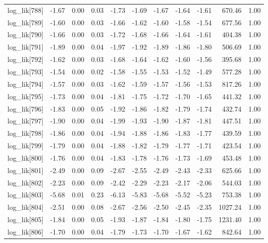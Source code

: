 \begin{table}[ht]
\begin{tabular}{rrrrrrrrrrr}
  log\_lik[788] & -1.67 & 0.00 & 0.03 & -1.73 & -1.69 & -1.67 & -1.64 & -1.61 & 670.46 & 1.00 \\ 
  log\_lik[789] & -1.60 & 0.00 & 0.03 & -1.66 & -1.62 & -1.60 & -1.58 & -1.54 & 677.56 & 1.00 \\ 
  log\_lik[790] & -1.66 & 0.00 & 0.03 & -1.72 & -1.68 & -1.66 & -1.64 & -1.61 & 404.38 & 1.00 \\ 
  log\_lik[791] & -1.89 & 0.00 & 0.04 & -1.97 & -1.92 & -1.89 & -1.86 & -1.80 & 506.69 & 1.00 \\ 
  log\_lik[792] & -1.62 & 0.00 & 0.03 & -1.68 & -1.64 & -1.62 & -1.60 & -1.56 & 395.68 & 1.00 \\ 
  log\_lik[793] & -1.54 & 0.00 & 0.02 & -1.58 & -1.55 & -1.53 & -1.52 & -1.49 & 577.28 & 1.00 \\ 
  log\_lik[794] & -1.57 & 0.00 & 0.03 & -1.62 & -1.59 & -1.57 & -1.56 & -1.53 & 817.26 & 1.00 \\ 
  log\_lik[795] & -1.73 & 0.00 & 0.04 & -1.81 & -1.75 & -1.72 & -1.70 & -1.65 & 441.32 & 1.00 \\ 
  log\_lik[796] & -1.83 & 0.00 & 0.05 & -1.92 & -1.86 & -1.82 & -1.79 & -1.74 & 432.74 & 1.00 \\ 
  log\_lik[797] & -1.90 & 0.00 & 0.04 & -1.99 & -1.93 & -1.90 & -1.87 & -1.81 & 447.51 & 1.00 \\ 
  log\_lik[798] & -1.86 & 0.00 & 0.04 & -1.94 & -1.88 & -1.86 & -1.83 & -1.77 & 439.59 & 1.00 \\ 
  log\_lik[799] & -1.79 & 0.00 & 0.04 & -1.88 & -1.82 & -1.79 & -1.77 & -1.71 & 423.54 & 1.00 \\ 
  log\_lik[800] & -1.76 & 0.00 & 0.04 & -1.83 & -1.78 & -1.76 & -1.73 & -1.69 & 453.48 & 1.00 \\ 
  log\_lik[801] & -2.49 & 0.00 & 0.09 & -2.67 & -2.55 & -2.49 & -2.43 & -2.33 & 625.66 & 1.00 \\ 
  log\_lik[802] & -2.23 & 0.00 & 0.09 & -2.42 & -2.29 & -2.23 & -2.17 & -2.06 & 544.03 & 1.00 \\ 
  log\_lik[803] & -5.68 & 0.01 & 0.23 & -6.13 & -5.83 & -5.68 & -5.52 & -5.23 & 753.38 & 1.00 \\ 
  log\_lik[804] & -2.51 & 0.00 & 0.08 & -2.67 & -2.56 & -2.50 & -2.45 & -2.35 & 1027.24 & 1.00 \\ 
  log\_lik[805] & -1.84 & 0.00 & 0.05 & -1.93 & -1.87 & -1.84 & -1.80 & -1.75 & 1231.40 & 1.00 \\ 
  log\_lik[806] & -1.70 & 0.00 & 0.04 & -1.79 & -1.73 & -1.70 & -1.67 & -1.62 & 842.64 & 1.00 \\ 

\end{tabular}
\end{table}
